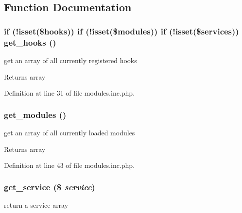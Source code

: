 \subsection{Function Documentation}
\hypertarget{modules_8inc_8php_adcaa12e356133b7fa0670571698b38cc}{
\subsubsection[{get\_\-hooks}]{\setlength{\rightskip}{0pt plus 5cm}if (!isset(\$hooks)) if (!isset(\$modules)) if (!isset(\$services)) get\_\-hooks ()}}
\label{modules_8inc_8php_adcaa12e356133b7fa0670571698b38cc}
get an array of all currently registered hooks

\begin{DoxyReturn}{Returns}
array 
\end{DoxyReturn}


Definition at line 31 of file modules.inc.php.

\hypertarget{modules_8inc_8php_a1b73e435e11b07906d0781b146b4aa21}{
\subsubsection[{get\_\-modules}]{\setlength{\rightskip}{0pt plus 5cm}get\_\-modules ()}}
\label{modules_8inc_8php_a1b73e435e11b07906d0781b146b4aa21}
get an array of all currently loaded modules

\begin{DoxyReturn}{Returns}
array 
\end{DoxyReturn}


Definition at line 43 of file modules.inc.php.

\hypertarget{modules_8inc_8php_abf7633223c2fd4ecb199a8e0dc070802}{
\subsubsection[{get\_\-service}]{\setlength{\rightskip}{0pt plus 5cm}get\_\-service (\$ {\em service})}}
\label{modules_8inc_8php_abf7633223c2fd4ecb199a8e0dc070802}
return a service-\/array

